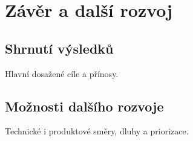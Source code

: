 \chapter{Závěr a další rozvoj}
\label{chap:zaver}

\section{Shrnutí výsledků}
Hlavní dosažené cíle a přínosy.

\section{Možnosti dalšího rozvoje}
Technické i produktové směry, dluhy a priorizace.
